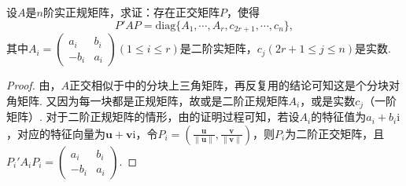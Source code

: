 \documentclass[../../main.tex]{subfiles}%
\begin{document}
\begin{proposition}\label{proposition:例9.90}
设\(A\)是\(n\)阶实正规矩阵，求证：存在正交矩阵\(P\)，使得
\[
P'AP = \mathrm{diag}\{A_1,\cdots,A_r,c_{2r + 1},\cdots,c_n\},
\]
其中\(A_i=\begin{pmatrix}a_i&b_i\\-b_i&a_i\end{pmatrix}(1\leqslant  i\leqslant  r)\)是二阶实矩阵，\(c_j(2r + 1\leqslant  j\leqslant  n)\)是实数.
\end{proposition}
\begin{proof}
由，\(A\)正交相似于中的分块上三角矩阵，再反复用的结论可知这是个分块对角矩阵. 又因为每一块都是正规矩阵，故或是二阶正规矩阵\(A_i\)，或是实数\(c_j\)（一阶矩阵）. 对于二阶正规矩阵的情形，由的证明过程可知，若设\(A_i\)的特征值为\(a_i + b_i\mathrm{i}\)，对应的特征向量为\(\boldsymbol{u}+ \boldsymbol{v}\mathrm{i}\)，令\(P_i = (\frac{\boldsymbol{u}}{\|\boldsymbol{u}\|},\frac{\boldsymbol{v}}{\|\boldsymbol{v}\|})\)，则\(P_i\)为二阶正交矩阵，且\(P_i'A_iP_i=\begin{pmatrix}a_i&b_i\\-b_i&a_i\end{pmatrix}\). 
\end{proof}
\end{document}

